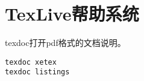 \section{TexLive帮助系统}
texdoc打开pdf格式的文档说明。
\begin{verbatim}
texdoc xetex
texdoc listings
\end{verbatim}







